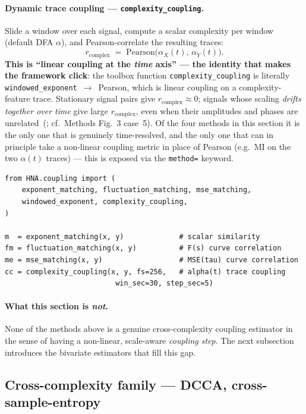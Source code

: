 \documentclass[11pt,a4paper]{article}
\begin{document}
\paragraph{Dynamic trace coupling --- \texttt{complexity\_coupling}.}
Slide a window over each signal, compute a scalar complexity per window
(default DFA $\alpha$), and Pearson-correlate the resulting traces:
\begin{equation}
r_{\text{complex}}\;=\;\mathrm{Pearson}\!\bigl(\alpha_X(t),\,\alpha_Y(t)\bigr).
\end{equation}
\textbf{This is ``linear coupling at the \emph{time} axis'' --- the
identity that makes the framework click}: the toolbox function
\texttt{complexity\_coupling} is literally
\texttt{windowed\_exponent}~$\to$~Pearson, which is linear coupling on
a complexity-feature trace. Stationary signal pairs give
$r_{\text{complex}}\approx 0$; signals whose scaling \emph{drifts
together over time} give large $r_{\text{complex}}$, even when their
amplitudes and phases are unrelated~(\cite{Marmelat2012}; cf.\ Methods
Fig.~3 case~5). Of the four methods in this section it is the only one
that is genuinely time-resolved, and the only one that can in principle
take a non-linear coupling metric in place of Pearson (e.g.\ MI on the
two $\alpha(t)$ traces) --- this is exposed via the \texttt{method=}
keyword.

\begin{lstlisting}
from HNA.coupling import (
    exponent_matching, fluctuation_matching, mse_matching,
    windowed_exponent, complexity_coupling,
)

m  = exponent_matching(x, y)             # scalar similarity
fm = fluctuation_matching(x, y)          # F(s) curve correlation
me = mse_matching(x, y)                  # MSE(tau) curve correlation
cc = complexity_coupling(x, y, fs=256,   # alpha(t) trace coupling
                          win_sec=30, step_sec=5)
\end{lstlisting}

\paragraph{What this section is \emph{not}.}
None of the methods above is a genuine cross-complexity coupling
estimator in the sense of having a non-linear, scale-aware
\emph{coupling step}. The next subsection introduces the bivariate
estimators that fill this gap.

\subsection{Cross-complexity family --- DCCA, cross-sample-entropy}
\label{sec:cross-complexity}
\end{document}
